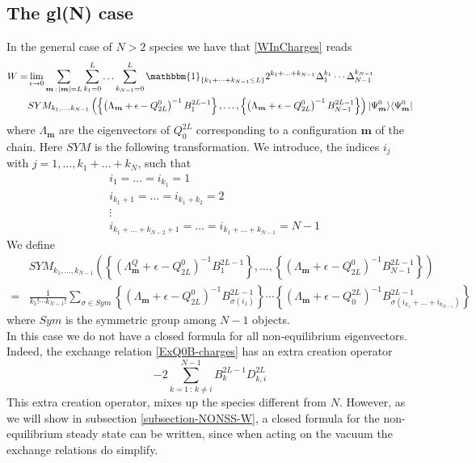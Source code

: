 \documentclass[10pt]{article}
\numberwithin{equation}{section}
\numberwithin{equation}{subsection}
\begin{document}
\subsection{The gl(N) case}\label{SubsectionGLN}
In the general case of $N>2$ species we have that \eqref{WInCharges} reads 
\begin{equation}\label{W-charges-Bad}
	\begin{split}
		W=&\lim_{\epsilon\to 0}\sum_{\bm{m}\,:\,|\bm{m}|=L}\sum_{k_{1}=0}^{L}\ldots\sum_{k_{N-1}=0}^{L}\mathbbm{1}_{\{k_{1}+\cdots+k_{N-1}\leq L\}}2^{k_{1}+\ldots+k_{N-1}}\Delta_{1}^{k_{1}}\cdots\Delta_{N-1}^{k_{N-1}}\\&SYM_{k_{1},\ldots,k_{N-1}}\left(\left\{\left(\Lambda_{\bm{m}}+\epsilon-Q_{2L}^{0}\right)^{-1}B_{1}^{2L-1}\right\},\ldots,\left\{\left(\Lambda_{\bm{m}}+\epsilon-Q_{2L}^{0}\right)^{-1}B_{N-1}^{2L-1}\right\}\right)
		|\Psi_{\bm{m}}^{0}\rangle \langle \Psi_{\bm{m}}^{0}|
	\end{split}
\end{equation}
where $\Lambda_{\bm{m}}$ are the eigenvectors of $Q_{0}^{2L}$ corresponding to a configuration $\bm{m}$ of the chain. Here $SYM$ is the following transformation. We introduce, the indices $i_{j}$ with $j=1,\ldots,k_{1}+\ldots+k_{N}$, such that 
\begin{equation}
	\begin{split}
		&i_{1}=\ldots=i_{k_{1}}=1\\
		&	i_{k_{1}+1}=\ldots=i_{k_{1}+k_{2}}=2\\
		&\vdots\\
		&i_{k_{1}+\ldots+k_{N-2}+1}=\ldots=i_{k_{1}+\ldots+k_{N-1}}=N-1
	\end{split}
\end{equation}
We define
\begin{equation}
	\begin{split}
		&SYM_{k_{1},\ldots,k_{N-1}}\left(\left\{\left(\Lambda_{\bm{m}}^{Q}+\epsilon-Q_{2L}^{0}\right)^{-1}B_{1}^{2L-1}\right\},\ldots,\left\{\left(\Lambda_{\bm{m}}+\epsilon-Q_{2L}^{0}\right)^{-1}B_{N-1}^{2L-1}\right\}\right)\\
		=&\frac{1}{k_{1}!\cdots k_{N-1}!}\sum_{\sigma\in Sym}\left\{\left(\Lambda_{\bm{m}}+\epsilon-Q_{2L}^{0}\right)^{-1}B_{\sigma(i_{1})}^{2L-1}\right\}\cdots \left\{\left(\Lambda_{\bm{m}}+\epsilon-Q_{0}^{2L}\right)^{-1}B_{\sigma(i_{k_{1}}+\ldots+i_{k_{N-1}})}^{2L-1}\right\}
	\end{split}
\end{equation}
where $Sym$ is the symmetric group among $N-1$ objects. \\
In this case we do not have a closed formula for all non-equilibrium eigenvectors. Indeed, the exchange relation \eqref{ExQ0B-charges} has an extra creation operator
\begin{equation}
	-2\sum_{k=1\,:\,k\neq i}^{N-1}B_{k}^{2L-1}D_{k,i}^{2L}
\end{equation}
This extra creation operator, mixes up the species different from $N$.  However, as we will show in subsection \ref{subsection-NONSS-W}, a closed formula for the non-equilibrium steady state can be written, since when acting on the vacuum the exchange relations do simplify. 
\end{document}
